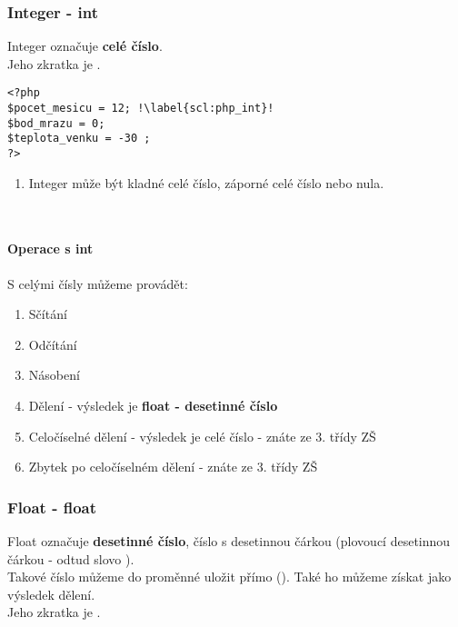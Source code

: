 \subsubsection{Integer - int}
Integer označuje \textbf{celé číslo}.\\Jeho zkratka je .\\
\begin{minipage}[t]{.45\textwidth}
\begin{code}
\begin{verbatim}
<?php 
$pocet_mesicu = 12; !\label{scl:php_int}!
$bod_mrazu = 0;
$teplota_venku = -30 ;
?>
\end{verbatim}

\label{code:typy_int}
\end{code}
\end{minipage}
\begin{minipage}[t]{.45\textwidth}
\begin{enumerate}
\item[ř. \ref{scl:php_int}:] Integer může být kladné celé číslo, záporné celé číslo nebo nula.
\end{enumerate}
\end{minipage}\\ 

\paragraph{Operace s int}
S celými čísly můžeme provádět:
\begin{enumerate}
\item[+] Sčítání
\item[-] Odčítání
\item[*] Násobení
\item[/] Dělení - výsledek je \textbf{float - desetinné číslo}
\item[//]Celočíselné dělení - výsledek je celé číslo - znáte ze 3. třídy ZŠ
\item[\%]Zbytek po celočíselném dělení - znáte ze 3. třídy ZŠ
\end{enumerate}

\subsubsection{Float - float}
Float označuje \textbf{desetinné číslo}, číslo s desetinnou čárkou (plovoucí desetinnou čárkou - odtud slovo ).\\
Takové číslo můžeme do proměnné uložit přímo (). Také ho můžeme získat jako výsledek dělení.\\
Jeho zkratka je .\\

